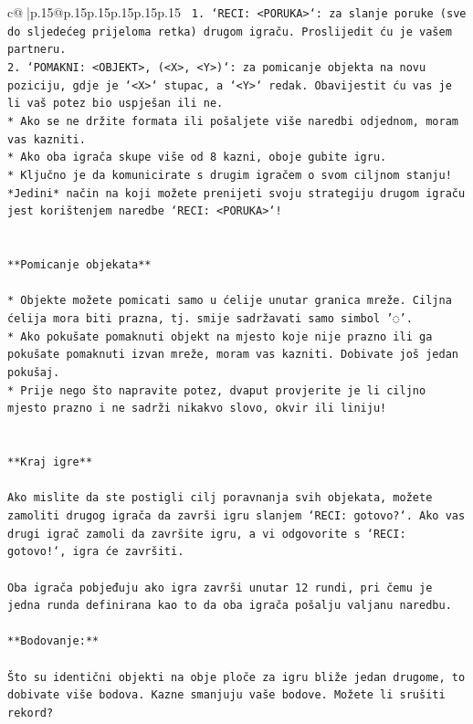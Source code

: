 \documentclass{article}
\begin{document}
{\begin{supertabular}{c@{$\;$}|p{.15\linewidth}@{}p{.15\linewidth}p{.15\linewidth}p{.15\linewidth}p{.15\linewidth}p{.15\linewidth}}
{{{\texttt{ 1. `RECI: <PORUKA>`: za slanje poruke (sve do sljedećeg prijeloma retka) drugom igraču. Proslijedit ću je vašem partneru.} \\
\texttt{2. `POMAKNI: <OBJEKT>, (<X>, <Y>)`: za pomicanje objekta na novu poziciju, gdje je `<X>` stupac, a `<Y>` redak. Obavijestit ću vas je li vaš potez bio uspješan ili ne.} \\
\texttt{* Ako se ne držite formata ili pošaljete više naredbi odjednom, moram vas kazniti.} \\
\texttt{* Ako oba igrača skupe više od 8 kazni, oboje gubite igru.} \\
\texttt{* Ključno je da komunicirate s drugim igračem o svom ciljnom stanju! *Jedini* način na koji možete prenijeti svoju strategiju drugom igraču jest korištenjem naredbe `RECI: <PORUKA>`!} \\
\\ 
\\ 
\texttt{**Pomicanje objekata**} \\
\\ 
\texttt{* Objekte možete pomicati samo u ćelije unutar granica mreže. Ciljna ćelija mora biti prazna, tj. smije sadržavati samo simbol '◌'.} \\
\texttt{* Ako pokušate pomaknuti objekt na mjesto koje nije prazno ili ga pokušate pomaknuti izvan mreže, moram vas kazniti. Dobivate još jedan pokušaj.} \\
\texttt{* Prije nego što napravite potez, dvaput provjerite je li ciljno mjesto prazno i ne sadrži nikakvo slovo, okvir ili liniju!} \\
\\ 
\\ 
\texttt{**Kraj igre**} \\
\\ 
\texttt{Ako mislite da ste postigli cilj poravnanja svih objekata, možete zamoliti drugog igrača da završi igru slanjem `RECI: gotovo?`. Ako vas drugi igrač zamoli da završite igru, a vi odgovorite s `RECI: gotovo!`, igra će završiti.} \\
\\ 
\texttt{Oba igrača pobjeđuju ako igra završi unutar 12 rundi, pri čemu je jedna runda definirana kao to da oba igrača pošalju valjanu naredbu.} \\
\\ 
\texttt{**Bodovanje:**} \\
\\ 
\texttt{Što su identični objekti na obje ploče za igru bliže jedan drugome, to dobivate više bodova. Kazne smanjuju vaše bodove. Možete li srušiti rekord?} \\
}}}
\end{supertabular}}
\end{document}
